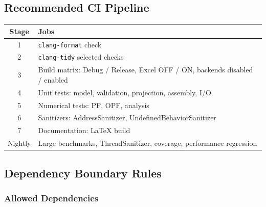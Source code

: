 \subsection{Recommended CI Pipeline}
\label{sec:ci-pipeline}

\begin{center}
\begin{tabular}{cl}
\hline\hline
\textbf{Stage} & \textbf{Jobs} \\
\hline
1 & \texttt{clang-format} check \\
2 & \texttt{clang-tidy} selected checks \\
3 & Build matrix: Debug / Release, Excel OFF / ON, backends disabled / enabled \\
4 & Unit tests: model, validation, projection, assembly, I/O \\
5 & Numerical tests: PF, OPF, analysis \\
6 & Sanitizers: AddressSanitizer, UndefinedBehaviorSanitizer \\
7 & Documentation: LaTeX build \\
\hline
Nightly & Large benchmarks, ThreadSanitizer, coverage, performance regression \\
\hline\hline
\end{tabular}
\end{center}

\subsection{Dependency Boundary Rules}
\label{sec:dep-rules}

\subsubsection{Allowed Dependencies}

